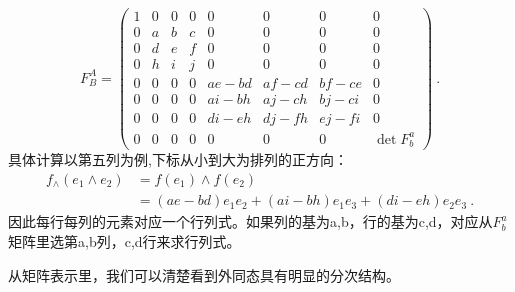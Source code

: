 \begin{equation}
F_B^A=\left(\begin{array}{cccccccc}
1 & 0 & 0 & 0 & 0 & 0 & 0 & 0 \\
0 & a & b & c & 0 & 0 & 0 & 0 \\
0 & d & e & f & 0 & 0 & 0 & 0 \\
0 & h & i & j & 0 & 0 & 0 & 0 \\
0 & 0 & 0 & 0 & a e-b d & a f-c d & b f-c e & 0 \\
0 & 0 & 0 & 0 & a i-b h & a j-c h & b j-c i & 0 \\
0 & 0 & 0 & 0 & d i-e h & d j-f h & e j-f i & 0 \\
0 & 0 & 0 & 0 & 0 & 0 & 0 & \operatorname{det} F_b^a
\end{array}\right) ~.
\end{equation}
具体计算以第五列为例,下标从小到大为排列的正方向：
\begin{equation}
\begin{aligned}
f_\wedge(e_1\wedge e_2)&=f(e_1)\wedge f(e_2)\\
&=(a e-b d)e_1 e_2+(a i-b h)e_1 e_3+ (d i-e h)e_2 e_3~.
\end{aligned}
\end{equation}
因此每行每列的元素对应一个行列式。如果列的基为a,b，行的基为c,d，对应从$F^a_b$矩阵里选第a,b列，c,d行来求行列式。




从矩阵表示里，我们可以清楚看到外同态具有明显的分次结构。